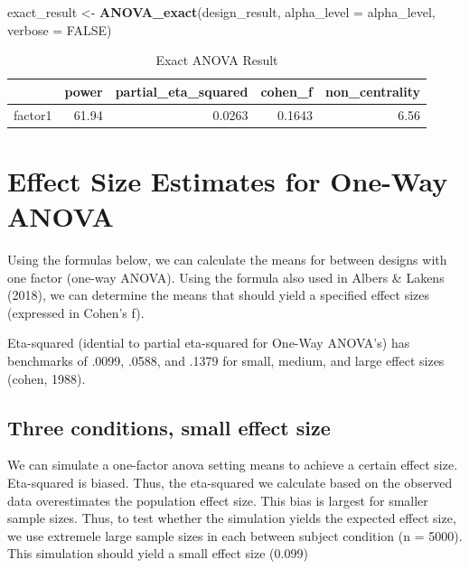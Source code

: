 \documentclass[]{book}
\newenvironment{Shaded}{\begin{snugshade}}{\end{snugshade}}
\newcommand{\DataTypeTok}[1]{\textcolor[rgb]{0.13,0.29,0.53}{#1}}
\newcommand{\KeywordTok}[1]{\textcolor[rgb]{0.13,0.29,0.53}{\textbf{#1}}}
\newcommand{\NormalTok}[1]{#1}
\newcommand{\OtherTok}[1]{\textcolor[rgb]{0.56,0.35,0.01}{#1}}
\newcommand{\StringTok}[1]{\textcolor[rgb]{0.31,0.60,0.02}{#1}}
\begin{document}
\begin{Shaded}
\begin{Highlighting}[]
\NormalTok{exact_result <-}\StringTok{ }\KeywordTok{ANOVA_exact}\NormalTok{(design_result,}
                            \DataTypeTok{alpha_level =}\NormalTok{ alpha_level,}
                            \DataTypeTok{verbose =} \OtherTok{FALSE}\NormalTok{)}
\end{Highlighting}
\end{Shaded}

\begin{table}[t]

\caption{\label{tab:unnamed-chunk-75}Exact ANOVA Result}
\centering
\begin{tabular}{l|r|r|r|r}
\hline
  & power & partial\_eta\_squared & cohen\_f & non\_centrality\\
\hline
factor1 & 61.94 & 0.0263 & 0.1643 & 6.56\\
\hline
\end{tabular}
\end{table}

\hypertarget{effect-size-estimates-for-one-way-anova}{%
\section{Effect Size Estimates for One-Way ANOVA}\label{effect-size-estimates-for-one-way-anova}}

Using the formulas below, we can calculate the means for between designs with one factor (one-way ANOVA). Using the formula also used in Albers \& Lakens (2018), we can determine the means that should yield a specified effect sizes (expressed in Cohen's f).

Eta-squared (idential to partial eta-squared for One-Way ANOVA's) has benchmarks of .0099, .0588, and .1379 for small, medium, and large effect sizes (cohen, 1988).

\hypertarget{three-conditions-small-effect-size}{%
\subsection{Three conditions, small effect size}\label{three-conditions-small-effect-size}}

We can simulate a one-factor anova setting means to achieve a certain effect size. Eta-squared is biased. Thus, the eta-squared we calculate based on the observed data overestimates the population effect size. This bias is largest for smaller sample sizes. Thus, to test whether the simulation yields the expected effect size, we use extremele large sample sizes in each between subject condition (n = 5000). This simulation should yield a small effect size (0.099)
\end{document}
